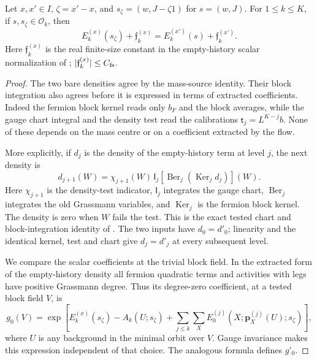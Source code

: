 \documentclass[11pt,letterpaper,reqno]{amsart}
\makeatletter
\theoremstyle{definition}
\newcommand{\ms@minorstart}{%
  \pushQED{\qed}\renewcommand{\qedsymbol}{$\blacksquare$}}
\newenvironment{proposition}[1][]{\ms@minorstart\ms@proposition[#1]}
  {\popQED\endms@proposition}
\theoremstyle{remark}
\makeatother
\begin{document}
\begin{proposition}[Compatibility of the vacuum energies]
\label{C-404-66}
Let \(x,x'\in I\), \(\zeta=x'-x\), and
\(s_\zeta=(w,J-\zeta1)\) for \(s=(w,J)\).
For \(1\le k\le K\), if \(s,s_\zeta\in\mathscr O_k\), then
\[
 E_k^{(x)}(s_\zeta)+\mathfrak f_k^{(x)}
       =E_k^{(x')}(s)+\mathfrak f_k^{(x')}.
\]
Here \(\mathfrak f_k^{(x)}\) is the real finite-size constant
in the empty-history scalar normalization of \cite[Lem. 9.15]{QCDM1};
\(|\mathfrak f_k^{(x)}|\le C_{\rm fs}\).
\end{proposition}

\begin{proof}
The two bare densities agree by the mass-source identity.
Their block integration also agrees before it is expressed
in terms of extracted coefficients. Indeed the fermion block
kernel reads only \(b_F\) and the block averages, while the gauge
chart integral and the density test read the calibrations
\(\mathsf t_j=L^{K-j}b\). None of these depends on the mass
centre or on a coefficient extracted by the flow.

More explicitly, if \(d_j\) is the density of the empty-history
term at level \(j\), the next density is
\[
 d_{j+1}(W)=\chi_{j+1}(W)\,
       \mathsf I_j\!\left[\operatorname{Ber}_j
                    (\operatorname{Ker}_j d_j)\right](W).
\]
Here $\chi_{j+1}$ is the density-test indicator,
$\mathsf I_j$ integrates the gauge chart, $\operatorname{Ber}_j$
integrates the old Grassmann variables, and
$\operatorname{Ker}_j$ is the fermion block kernel.
The density is zero when \(W\) fails the test. This is the exact
tested chart and block-integration identity of
\cite[Lem. 7.1 and Prop. 10.1]{QCDM1}. The two inputs have \(d_0=d'_0\);
linearity and the identical kernel, test and chart give
\(d_j=d'_j\) at every subsequent level.

We compare the scalar coefficients at the trivial block field.
In the extracted form of the empty-history density all
fermion quadratic terms and activities with legs have positive
Grassmann degree. Thus its degree-zero coefficient, at a
tested block field \(V\), is
\begin{equation}\label{eq:qcdm2-mass-scalar-density}
 g_0(V)=\exp\left[
 E_k^{(x)}(s_\zeta)-A_k(U;s_\zeta)
       +\sum_{j\le k}\sum_X
          E^{(j)}_0(X;\mathbf p_X^{(j)}(U);s_\zeta)
                         \right],
\end{equation}
where \(U\) is any background in the minimal orbit over \(V\).
Gauge invariance makes this expression independent of that
choice. The analogous formula defines \(g'_0\).


\end{proof}
\end{document}
